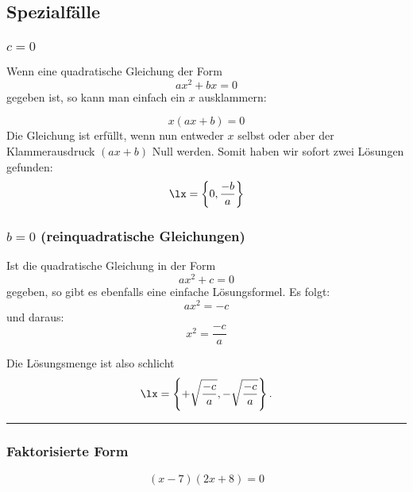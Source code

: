 \subsection{Spezialfälle}


\subsubsection{$c=0$}
Wenn eine quadratische Gleichung der Form
$$ax^2 +bx = 0$$
gegeben ist, so kann man einfach ein $x$ ausklammern:

$$x(ax+b)=0$$
 Die Gleichung ist erfüllt, wenn nun entweder $x$ selbst oder aber
 der Klammerausdruck $(ax+b)$ Null werden. Somit haben wir sofort zwei
 Lösungen gefunden:
 $$\lx=\left\{0, \frac{-b}{a}\right\}$$

 \newpage

 
 \subsubsection{$b=0$ (reinquadratische Gleichungen)}
 Ist die quadratische Gleichung in der Form
 $$ax^2 + c = 0$$
 gegeben, so gibt es ebenfalls eine einfache Lösungsformel. Es folgt:
 $$ax^2 = -c$$
 und daraus:
 $$x^2 = \frac{-c}{a}$$

 Die Lösungsmenge ist also schlicht
 $$\lx=\left\{ + \sqrt{\frac{-c}{a}}, -\sqrt{\frac{-c}{a}} \right\}.$$

 \hrule

 \subsubsection{Faktorisierte Form}

 
$$(x-7)(2x+8) = 0$$


\newpage
